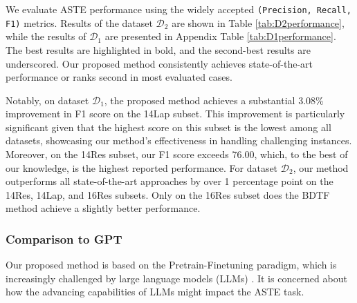 \documentclass[11pt]{article}
\begin{document}
We evaluate ASTE performance using the widely accepted \texttt{(Precision, Recall, F1)} metrics. 
Results of the dataset $\mathcal{D}_2$ are shown in Table \ref{tab:D2performance}, while the results of $\mathcal{D}_1$ are presented in Appendix Table \ref{tab:D1performance}. The best results are highlighted in bold, and the second-best results are underscored. Our proposed method consistently achieves state-of-the-art performance or ranks second in most evaluated cases.

Notably, on dataset $\mathcal{D}_1$, the proposed method achieves a substantial 3.08\% improvement in F1 score on the 14Lap subset. This improvement is particularly significant given that the highest score on this subset is the lowest among all datasets, showcasing our method's effectiveness in handling challenging instances. Moreover, on the 14Res subset, our F1 score exceeds 76.00, which, to the best of our knowledge, is the highest reported performance. For dataset $\mathcal{D}_2$, our method outperforms all state-of-the-art approaches by over 1 percentage point on the 14Res, 14Lap, and 16Res subsets. Only on the 16Res subset does the BDTF method \citep{zhang2022boundary} achieve a slightly better performance. 




\subsubsection{Comparison to GPT}
Our proposed method is based on the Pretrain-Finetuning paradigm, which is increasingly challenged by large language models (LLMs) \cite{kojima2022large, wei2021finetuned}. It is concerned about how the advancing capabilities of LLMs might impact the ASTE task.
\end{document}
